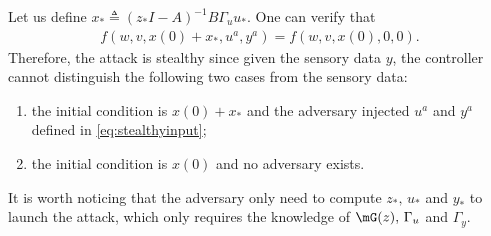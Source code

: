   Let us define $x_* \triangleq (z_*I-A)^{-1}B\Gamma_u u_*$. One can verify that
  \begin{align*}
    f(w,v,x(0)+x_*,u^a,y^a) = f(w,v,x(0),0,0).
  \end{align*}
  Therefore, the attack is stealthy since given the sensory data $y$, the controller cannot distinguish the following two cases from the sensory data:
  \begin{enumerate}
    \item the initial condition is $x(0)+x_*$ and the adversary injected $u^a$ and $y^a$ defined in \eqref{eq:stealthyinput};
    \item the initial condition is $x(0)$ and no adversary exists.
  \end{enumerate}

  \begin{remark}
    It is worth noticing that the adversary only need to compute $z_*,\,u_*$ and $y_*$ to launch the attack, which only requires the knowledge of $\mG(z),\,\Gamma_u$ and $\Gamma_y$. 
  \end{remark}


